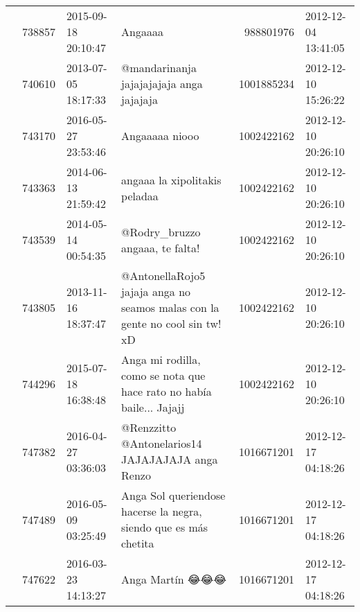 \begin{tabular}{llllrl}
           & 738857  & 2015-09-18 20:10:47 &                                                                                                                                      Angaaaa &   988801976 & 2012-12-04 13:41:05 \\
           & 740610  & 2013-07-05 18:17:33 &                                                                                                     @mandarinanja jajajajajaja anga jajajaja &  1001885234 & 2012-12-10 15:26:22 \\
           & 743170  & 2016-05-27 23:53:46 &                                                                                                                               Angaaaaa niooo &  1002422162 & 2012-12-10 20:26:10 \\
           & 743363  & 2014-06-13 21:59:42 &                                                                                                                angaaa la xipolitakis peladaa &  1002422162 & 2012-12-10 20:26:10 \\
           & 743539  & 2014-05-14 00:54:35 &                                                                                                              @Rodry\_bruzzo angaaa, te falta! &  1002422162 & 2012-12-10 20:26:10 \\
           & 743805  & 2013-11-16 18:37:47 &                                                                  @AntonellaRojo5 jajaja anga no seamos malas con la gente no cool sin tw! xD &  1002422162 & 2012-12-10 20:26:10 \\
           & 744296  & 2015-07-18 16:38:48 &                                                                         Anga mi rodilla, como se nota que hace rato no había baile... Jajajj &  1002422162 & 2012-12-10 20:26:10 \\
           & 747382  & 2016-04-27 03:36:03 &                                                                                             @Renzzitto @Antonelarios14 JAJAJAJAJA anga Renzo &  1016671201 & 2012-12-17 04:18:26 \\
           & 747489  & 2016-05-09 03:25:49 &                                                                             Anga Sol queriendose hacerse la negra, siendo que es más chetita &  1016671201 & 2012-12-17 04:18:26 \\
           & 747622  & 2016-03-23 14:13:27 &                                                                                                                              Anga Martín 😂😂😂 &  1016671201 & 2012-12-17 04:18:26 \\

\end{tabular}
